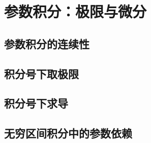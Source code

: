 \section{参数积分：极限与微分}
\label{b1:sec:0504}


\subsection{参数积分的连续性}
\label{b1:subsec:050401}

\subsection{积分号下取极限}
\label{b1:subsec:050402}

\subsection{积分号下求导}
\label{b1:subsec:050403}

\subsection{无穷区间积分中的参数依赖}
\label{b1:subsec:050404}


